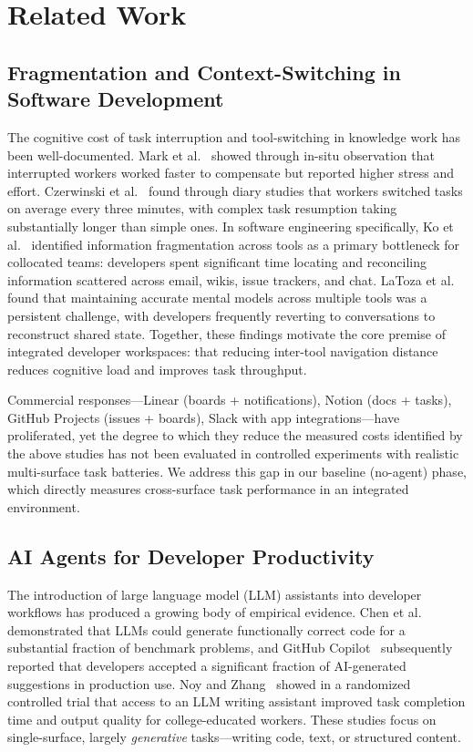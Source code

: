 \section{Related Work}
\label{sec:related}

\subsection{Fragmentation and Context-Switching in Software Development}
\label{sec:related:fragmentation}

The cognitive cost of task interruption and tool-switching in knowledge work has
been well-documented. Mark et al.~\cite{mark2008cost} showed through in-situ
observation that interrupted workers worked faster to compensate but reported
higher stress and effort. Czerwinski et al.~\cite{czerwinski2004diary} found
through diary studies that workers switched tasks on average every three
minutes, with complex task resumption taking substantially longer than simple
ones. In software engineering specifically, Ko et al.~\cite{ko2007information}
identified information fragmentation across tools as a primary bottleneck for
collocated teams: developers spent significant time locating and reconciling
information scattered across email, wikis, issue trackers, and chat. LaToza
et al.~\cite{latoza2006maintaining} found that maintaining accurate mental
models across multiple tools was a persistent challenge, with developers
frequently reverting to conversations to reconstruct shared state. Together,
these findings motivate the core premise of integrated developer workspaces:
that reducing inter-tool navigation distance reduces cognitive load and
improves task throughput.

Commercial responses---Linear (boards + notifications), Notion (docs +
tasks), GitHub Projects (issues + boards), Slack with app integrations---have
proliferated, yet the degree to which they reduce the measured costs identified
by the above studies has not been evaluated in controlled experiments with
realistic multi-surface task batteries. We address this gap in our baseline
(no-agent) phase, which directly measures cross-surface task performance in an
integrated environment.

\subsection{AI Agents for Developer Productivity}
\label{sec:related:agents}

The introduction of large language model (LLM) assistants into developer
workflows has produced a growing body of empirical evidence. Chen et
al.~\cite{chen2021codex} demonstrated that LLMs could generate functionally
correct code for a substantial fraction of benchmark problems, and GitHub
Copilot~\cite{copilot2022} subsequently reported that developers accepted a
significant fraction of AI-generated suggestions in production use. Noy and
Zhang~\cite{noy2023} showed in a randomized controlled trial that access to an
LLM writing assistant improved task completion time and output quality for
college-educated workers. These studies focus on single-surface, largely
\emph{generative} tasks---writing code, text, or structured content.

